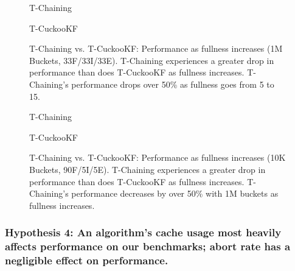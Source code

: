 \vspace{12pt}
\noindent{}

\begin{figure}[H]
    \centering
    \begin{minipage}{0.7\textwidth}
    \caption*{T-Chaining}
        \vspace{12pt}
    \end{minipage}
    \begin{minipage}{0.7\textwidth}
    \caption*{T-CuckooKF}
    \end{minipage}
    \caption[T-Chaining vs. T-CuckooKF: Performance as fullness increases (1M Buckets, 33F/33I/33E)]{T-Chaining vs. T-CuckooKF: Performance as fullness increases (1M Buckets, 33F/33I/33E). T-Chaining experiences a greater drop in performance than does T-CuckooKF as fullness increases. T-Chaining's performance drops over 50\% as fullness goes from 5 to 15.}
    \label{fig:hm_fullness_33_2}
\end{figure}

\begin{figure}[H]
    \centering
    \begin{minipage}{0.70\textwidth}
    \caption*{T-Chaining}
        \vspace{12pt}
    \end{minipage}
    \begin{minipage}{0.70\textwidth}
    \caption*{T-CuckooKF}
    \end{minipage}
    \caption[T-Chaining vs. T-CuckooKF: Performance as fullness increases (1M Buckets, 90F/5I/5E)]{T-Chaining vs. T-CuckooKF: Performance as fullness increases (10K Buckets, 90F/5I/5E). T-Chaining experiences a greater drop in performance than does T-CuckooKF as fullness increases. T-Chaining's performance decreases by over 50\% with 1M buckets as fullness increases.}
    \label{fig:hm_fullness_90_2}
\end{figure}

\subsubsection{Hypothesis 4: An algorithm's cache usage most heavily affects performance on our benchmarks; abort rate has a negligible effect on performance.}


